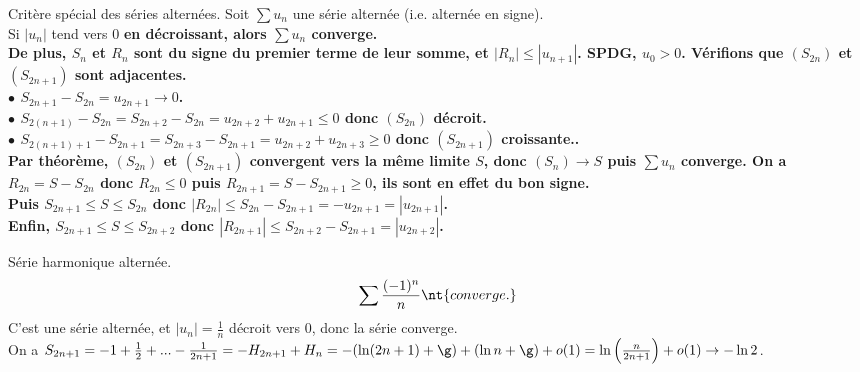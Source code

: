 \documentclass[11pt]{article}
\begin{document}
\begin{prop}{Critère spécial des séries alternées.}{}
    Soit $\sum u_n$ une série alternée (i.e. alternée en signe).\\
    Si $|u_n|$ tend vers 0 \bf{en décroissant}, alors $\sum u_n$ converge.\\
    De plus, $S_n$ et $R_n$ sont du signe du premier terme de leur somme, et $|R_n|\leq|u_{n+1}|$.
    \tcblower
    SPDG, $u_0>0$. Vérifions que $(S_{2n})$ et $(S_{2n+1})$ sont adjacentes.\\
    $\bullet$ $S_{2n+1}-S_{2n}=u_{2n+1}\to0$.\\
    $\bullet$ $S_{2(n+1)}-S_{2n}=S_{2n+2}-S_{2n}=u_{2n+2}+u_{2n+1}\leq 0$ donc $(S_{2n})$ décroit.\\
    $\bullet$ $S_{2(n+1)+1}-S_{2n+1}=S_{2n+3}-S_{2n+1}=u_{2n+2}+u_{2n+3}\geq0$ donc $(S_{2n+1})$ croissante..\\
    Par théorème, $(S_{2n})$ et $(S_{2n+1})$ convergent vers la même limite $S$, donc $(S_n)\to S$ puis $\sum u_n$ converge.\n
    On a $R_{2n}=S-S_{2n}$ donc $R_{2n}\leq0$ puis $R_{2n+1}=S-S_{2n+1}\geq0$, ils sont en effet du bon signe.\\
    Puis $S_{2n+1}\leq S \leq S_{2n}$ donc $|R_{2n}|\leq S_{2n} - S_{2n+1}=-u_{2n+1}=|u_{2n+1}|$.\\
    Enfin, $S_{2n+1}\leq S \leq S_{2n+2}$ donc $|R_{2n+1}|\leq S_{2n+2}-S_{2n+1}=|u_{2n+2}|$.
\end{prop}

\vspace*{-0.7cm}

\begin{ex}{Série harmonique alternée.}{}
    \begin{equation*}
        \sum\frac{(-1)^n}{n} \nt{ converge.}
    \end{equation*}
    \tcblower
    C'est une série alternée, et $|u_n|=\frac{1}{n}$ décroit vers 0, donc la série converge.\\
    On a $S_{2n+1}=-1+\frac{1}{2}+...-\frac{1}{2n+1}=-H_{2n+1}+H_n=-(\ln(2n+1)+\g)+(\ln n + \g) + o(1) = \ln\left( \frac{n}{2n+1} \right) + o(1) \to -\ln 2$.
\end{ex}
\end{document}
